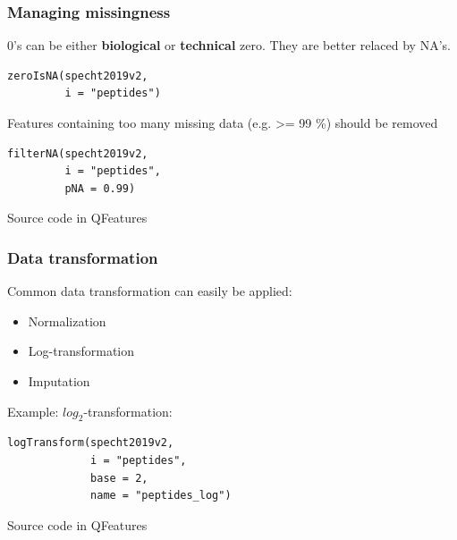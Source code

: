 \documentclass{beamer}
\newcommand{\hcode}[2][lgray]{{\ttfamily\color{vdgray}\colorbox{#1}{#2}}}
\newcommand{\frametitlesection}[1]{\frametitle{\centering #1 \footnotesize \hspace{0pt plus 1 filll} \insertsection}}
\begin{document}
\begin{frame}[fragile]
    \frametitlesection{Managing missingness}
    
    \hcode{0}'s can be either \textbf{biological} or \textbf{technical} zero. 
    They are better relaced by \hcode{NA}'s.
    
    \begin{lstlisting}
zeroIsNA(specht2019v2,
         i = "peptides")
    \end{lstlisting}
    
    Features containing too many missing data (e.g. >= 99 \%) should be removed
    
    \begin{lstlisting}
filterNA(specht2019v2, 
         i = "peptides", 
         pNA = 0.99)
    \end{lstlisting}
    
    Source code in \hcode{QFeatures}
    
\end{frame}

\begin{frame}[fragile]
    \frametitlesection{Data transformation}
    
    Common data transformation can easily be applied:
    
    \begin{itemize}
        \item{Normalization}
        \item{Log-transformation}
        \item{Imputation}
    \end{itemize}
    
    Example: $log_2$-transformation:
    
    \begin{lstlisting}
logTransform(specht2019v2, 
             i = "peptides", 
             base = 2,
             name = "peptides_log")
    \end{lstlisting}
    
    Source code in \hcode{QFeatures}
    
\end{frame}
\end{document}
